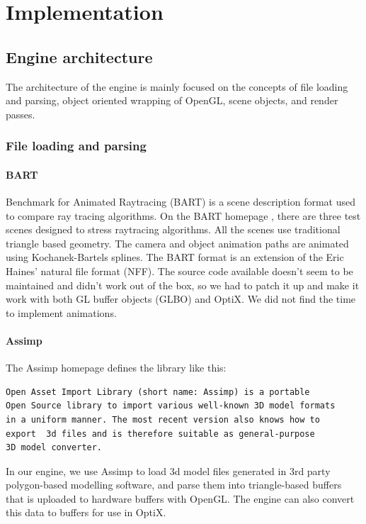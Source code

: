 \section{Implementation}

\subsection{Engine architecture}
The architecture of the engine is mainly focused on the concepts of file loading and parsing, object oriented wrapping of OpenGL, scene objects, and render passes.

\subsubsection{File loading and parsing}
\paragraph{BART}
Benchmark for Animated Raytracing (BART) is a scene description format used to compare ray tracing algorithms. On the BART homepage \cite{bart_homepage}, there are three test scenes designed to stress raytracing algorithms. All the scenes use traditional triangle based geometry. The camera and object animation paths are animated using  Kochanek-Bartels splines. The BART format is an extension of the Eric Haines' natural file format (NFF). The source code available doesn't seem to be maintained and didn't work out of the box, so we had to patch it up and make it work with both GL buffer objects (GLBO) and OptiX. We did not find the time to implement animations.

\paragraph{Assimp}
The Assimp homepage \cite{assimp_homepage} defines the library like this:
\begin{Verbatim}[frame=single,fontshape=it,framesep=1mm]
Open Asset Import Library (short name: Assimp) is a portable
Open Source library to import various well-known 3D model formats
in a uniform manner. The most recent version also knows how to 
export  3d files and is therefore suitable as general-purpose 
3D model converter.
\end{Verbatim}

In our engine, we use Assimp to load 3d model files generated in 3rd party polygon-based modelling software, and parse them into triangle-based buffers that is uploaded to hardware buffers with OpenGL. The engine can also convert this data to buffers for use in OptiX.

